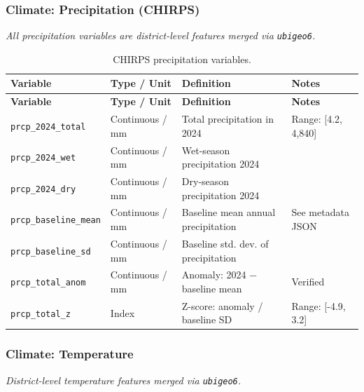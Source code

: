 \documentclass[11pt,a4paper]{article}
\begin{document}
\subsubsection{Climate: Precipitation (CHIRPS)}

\textit{All precipitation variables are district-level features merged via \texttt{ubigeo6}.}

\begin{longtable}{L{2.5cm}L{2.5cm}L{5.5cm}L{3.5cm}}
\caption{CHIRPS precipitation variables.} \\
\toprule
\textbf{Variable} & \textbf{Type / Unit} & \textbf{Definition} & \textbf{Notes} \\
\midrule
\endfirsthead
\toprule
\textbf{Variable} & \textbf{Type / Unit} & \textbf{Definition} & \textbf{Notes} \\
\midrule
\endhead
\bottomrule
\endlastfoot
\texttt{prcp\_2024\_total} & Continuous / mm & Total precipitation in 2024 & Range: [4.2, 4,840] \\
\texttt{prcp\_2024\_wet} & Continuous / mm & Wet-season precipitation 2024 & \\
\texttt{prcp\_2024\_dry} & Continuous / mm & Dry-season precipitation 2024 & \\
\texttt{prcp\_baseline\_mean} & Continuous / mm & Baseline mean annual precipitation & See metadata JSON \\
\texttt{prcp\_baseline\_sd} & Continuous / mm & Baseline std. dev. of precipitation & \\
\texttt{prcp\_total\_anom} & Continuous / mm & Anomaly: 2024 $-$ baseline mean & Verified \\
\texttt{prcp\_total\_z} & Index & Z-score: anomaly / baseline SD & Range: [-4.9, 3.2] \\
\end{longtable}

\subsubsection{Climate: Temperature}

\textit{District-level temperature features merged via \texttt{ubigeo6}.}
\end{document}
